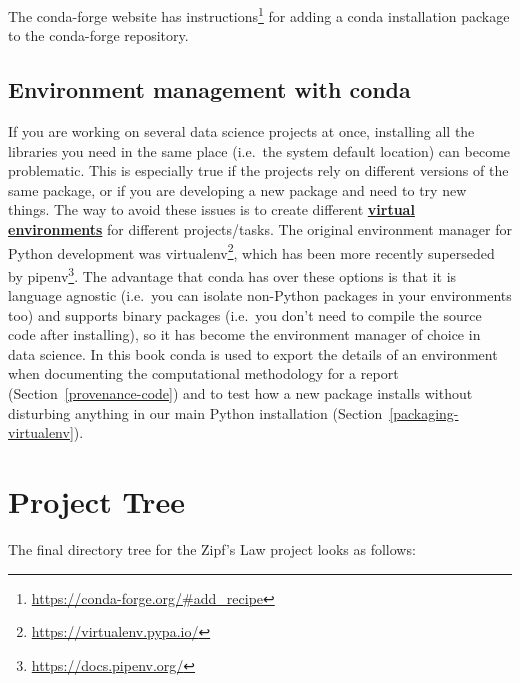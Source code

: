 \documentclass[
]{krantz}
\renewcommand{\href}[2]{#2\footnote{\url{#1}}}
\newcommand{\gref}[2]{\hyperlink{#2}{\textbf{#1}}}
\begin{document}
The conda-forge website has \href{https://conda-forge.org/\#add_recipe}{instructions}
for adding a conda installation package to the conda-forge repository.

\hypertarget{anaconda-environments}{%
\section{Environment management with conda}\label{anaconda-environments}}

If you are working on several data science projects at once,
installing all the libraries you need in the same place
(i.e.~the system default location) can become problematic.
This is especially true if the projects rely on different versions of the same package,
or if you are developing a new package and need to try new things.
The way to avoid these issues is to create different
\gref{virtual environments}{virtual\_environment} for different projects/tasks.
The original environment manager for Python development was \href{https://virtualenv.pypa.io/}{virtualenv},
which has been more recently superseded by \href{https://docs.pipenv.org/}{pipenv}.
The advantage that conda has over these options is that it is language agnostic
(i.e.~you can isolate non-Python packages in your environments too) and
supports binary packages (i.e.~you don't need to compile the source code after installing),
so it has become the environment manager of choice in data science.
In this book conda is used to export the details of an environment
when documenting the computational methodology for a report (Section~\ref{provenance-code})
and to test how a new package installs without disturbing anything
in our main Python installation (Section~\ref{packaging-virtualenv}).

\hypertarget{tree}{%
\chapter{Project Tree}\label{tree}}

The final directory tree for the Zipf's Law project looks as follows:
\end{document}
